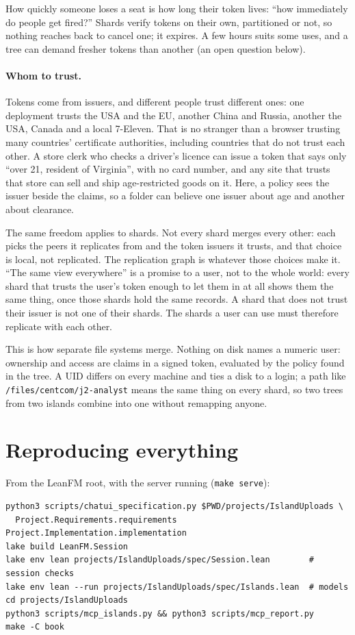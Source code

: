 \documentclass[11pt,oneside]{book}
\begin{document}
How quickly someone loses a seat is how long their token lives: ``how immediately
do people get fired?'' Shards verify tokens on their own, partitioned or not, so
nothing reaches back to cancel one; it expires. A few hours suits some uses, and
a tree can demand fresher tokens than another (an open question below).

\paragraph{Whom to trust.} Tokens come from issuers, and different people trust
different ones: one deployment trusts the USA and the EU, another China and
Russia, another the USA, Canada and a local 7-Eleven. That is no stranger than a
browser trusting many countries' certificate authorities, including countries that
do not trust each other. A store clerk who checks a driver's licence can issue a
token that says only ``over 21, resident of Virginia'', with no card number, and
any site that trusts that store can sell and ship age-restricted goods on it.
Here, a policy sees the issuer beside the claims, so a folder can believe one
issuer about age and another about clearance.

The same freedom applies to shards. Not every shard merges every other: each
picks the peers it replicates from and the token issuers it trusts, and that
choice is local, not replicated. The replication graph is whatever those choices
make it. ``The same view everywhere'' is a promise to a user, not to the whole
world: every shard that trusts the user's token enough to let them in at all
shows them the same thing, once those shards hold the same records. A shard that
does not trust their issuer is not one of their shards. The shards a user can
use must therefore replicate with each other.

This is how separate file systems merge. Nothing on disk names a numeric user:
ownership and access are claims in a signed token, evaluated by the policy found
in the tree. A UID differs on every machine and ties a disk to a login; a path
like \texttt{/files/centcom/j2-analyst} means the same thing on every shard, so two
trees from two islands combine into one without remapping anyone.

\section{Reproducing everything}
From the LeanFM root, with the server running (\texttt{make serve}):
\begin{Verbatim}
python3 scripts/chatui_specification.py $PWD/projects/IslandUploads \
  Project.Requirements.requirements Project.Implementation.implementation
lake build LeanFM.Session
lake env lean projects/IslandUploads/spec/Session.lean        # session checks
lake env lean --run projects/IslandUploads/spec/Islands.lean  # models
cd projects/IslandUploads
python3 scripts/mcp_islands.py && python3 scripts/mcp_report.py
make -C book
\end{Verbatim}
\end{document}
